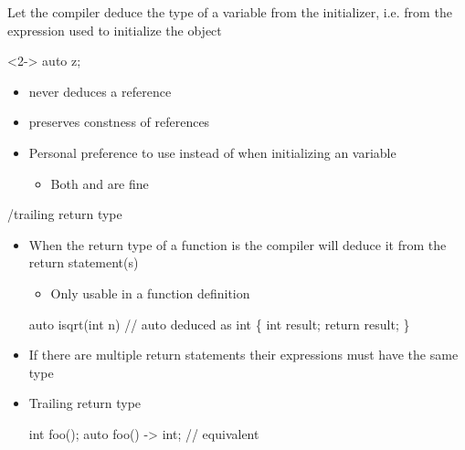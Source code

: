 \begin{frame}[fragile]{}

  Let the compiler deduce the type of a variable from the initializer, i.e. from
  the expression used to initialize the object

  \begin{codeblock}<2->{
auto z;                        }\end{codeblock}

  \begin{itemize}
  \item<10->  never deduces a reference
  \item<11->  preserves constness of references
  \item<15-> Personal preference to use \code{=} instead of \code{\{\}} when
    initializing an  variable
    \begin{itemize}
    \item Both  and  are fine
    \end{itemize}
  \end{itemize}
\end{frame}

\begin{frame}[fragile]{/trailing return type}

  \begin{itemize}
  \item When the return type of a function is  the compiler will
    deduce it from the return statement(s)
    \begin{itemize}
    \item Only usable in a function definition
    \end{itemize}

    \begin{codeblock}
auto isqrt(int n)    // auto deduced as int
\{
  int result;
  \ddd
  return result;
\}
\end{codeblock}

  \item<2-> If there are multiple return statements their expressions must have the
    same type
  \item<3-> Trailing return type
    \begin{codeblock}
int foo(\ddd);
auto foo(\ddd) -> int; // equivalent\end{codeblock}

  \end{itemize}

\end{frame}

